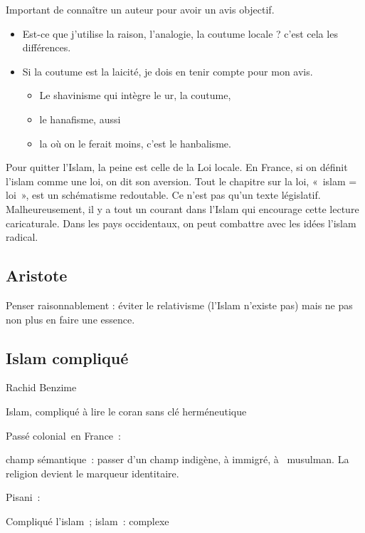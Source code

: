 Important de connaître un auteur pour avoir un avis objectif.





\begin{itemize}

  
\item  Est-ce que j'utilise la raison, l'analogie, la coutume locale ? c'est
  cela les différences.
\item  Si la coutume est la laicité, je dois en tenir compte pour mon avis.

  \begin{itemize}
  \item    Le shavinisme qui intègre le ur, la coutume,
  \item     le hanafisme, aussi~
  \item    la où on le ferait moins, c'est le hanbalisme.
  \end{itemize}
\end{itemize}



  Pour quitter l'Islam, la peine est celle de la Loi locale. En France,
  si on définit l'islam comme une loi, on dit son aversion. Tout le
  chapitre sur la loi, «~islam = loi~», est un schématisme redoutable.
  Ce n'est pas qu'un texte législatif. Malheureusement, il y a tout un
  courant dans l'Islam qui encourage cette lecture caricaturale. Dans
  les pays occidentaux, on peut combattre avec les idées l'islam
  radical.
  
  \subsection{Aristote}
  Penser raisonnablement : éviter le relativisme (l'Islam n'existe pas) mais ne pas non plus en faire une essence.
  
  \subsection{Islam compliqué}


Rachid Benzime

Islam, compliqué à lire le coran sans clé herméneutique

Passé colonial~en France~:

champ sémantique~: passer d'un champ indigène, à immigré, à ~musulman.
La religion devient le marqueur identitaire.

Pisani~:

Compliqué l'islam~; islam~: complexe

